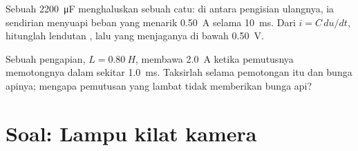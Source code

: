 \begin{exercise}[$\star\star\star$]\label{exo:g12:rc-rl-circuits:14}
Sebuah  \qty{2200}{\micro F} menghaluskan sebuah catu: di antara pengisian ulangnya,
ia sendirian menyuapi beban yang menarik \qty{0.50}{A} selama \qty{10}{ms}. Dari
$i = C\,du/dt$, hitunglah lendutan , lalu  yang
menjaganya di bawah \qty{0.50}{V}.
\end{exercise}

\begin{exercise}[$\star\star\star$]\label{exo:g12:rc-rl-circuits:15}
Sebuah  pengapian, $L = \qty{0.80}{H}$, membawa \qty{2.0}{A} ketika
pemutusnya memotongnya dalam sekitar \qty{1.0}{ms}. Taksirlah  
selama pemotongan itu dan  bunga apinya; mengapa pemutusan yang lambat
tidak memberikan bunga api?
\end{exercise}

\section{Soal: Lampu kilat kamera}

